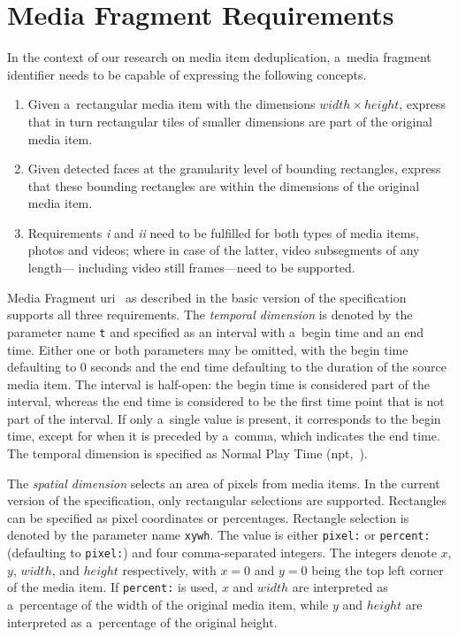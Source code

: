 \documentclass{article}
\begin{document}
\section{Media Fragment Requirements}
\label{sec:media-fragment-requirements}

In the context of our research on media item deduplication,
a~media fragment identifier needs to be capable of expressing the following concepts.

\begin{enumerate}[i]
  \item Given a~rectangular media item with the dimensions $ width \times height $,
    express that in turn rectangular tiles
    of smaller dimensions are part of the original media item.
  \item Given detected faces at the granularity level of bounding rectangles,
    express that these bounding rectangles are within the dimensions
    of the original media item.
  \item Requirements \textit{i} and \textit{ii} need to be fulfilled for both
    types of media items, photos and videos;
    where in case of the latter, video subsegments of any length---%
    including video still frames---need to be supported.
\end{enumerate}

Media Fragment {\sc uri}~\cite{troncy2012mediafragments} as described in
the basic version of the specification supports all three requirements.
The \emph{temporal dimension} is denoted by the parameter name \texttt{t}
and specified as an interval with a~begin time and an end time.
Either one or both parameters may be omitted,
with the begin time defaulting to 0 seconds
and the end time defaulting to the duration of the source media item.
The interval is half-open: the begin time is considered part of the interval,
whereas the end time is considered to be the first time point
that is not part of the interval.
If only a~single value is present, it corresponds to the begin time,
except for when it is preceded by a~comma, which indicates the end time.
The temporal dimension is specified as Normal Play Time ({\sc npt},~\cite{schulzrinne1998realtime}).

The \emph{spatial dimension} selects an area of pixels from media items.
In the current version of the specification,
only rectangular selections are supported.
Rectangles can be specified as pixel coordinates or percentages.
Rectangle selection is denoted by the parameter name \texttt{xywh}.
The value is either \texttt{pixel:} or \texttt{percent:}
(defaulting to \texttt{pixel:}) and four comma-separated integers.
The integers denote $ x $, $ y $, $ width $, and $ height $ respectively,
with $ x = 0 $ and $ y = 0 $ being the top left corner of the media item.
If \texttt{percent:} is used,
$ x $ and $ width $ are interpreted as a~percentage
of the width of the original media item,
while $ y $ and $ height $ are interpreted as a~percentage
of the original height.
\end{document}
